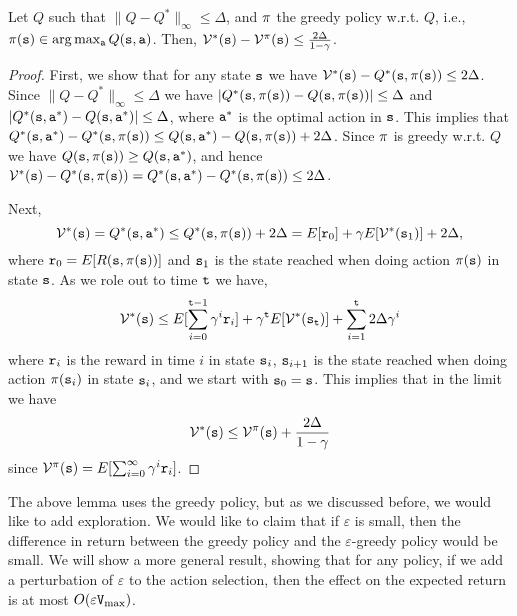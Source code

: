 \begin{lemma}
\label{lemma:Q-greedy-policy}
%
Let $Q$ such that $\| Q-Q^*\|_\infty \leq \Delta$, and $\pi$ the
greedy policy w.r.t. $Q$, i.e., $\pi({\tt s})\in \arg\max_{\tt a}
Q({\tt s},{\tt a})$. Then,
$\mathcal{V}^*({\tt s})-\mathcal{V}^\pi({\tt s})\leq
\frac{2\Delta}{1-\gamma}$.
\end{lemma}
\begin{proof}
First, we show that for any state ${\tt s}$ we have
$\mathcal{V}^*({\tt s})-Q^*({\tt s},\pi({\tt s}))\leq 2\Delta$. Since
$\| Q-Q^*\|_\infty \leq \Delta$ we have
$|Q^*({\tt s},\pi({\tt s}))-Q({\tt s},\pi({\tt s}))|\leq \Delta$
and $|Q^*({\tt s},{\tt a}^*)-Q({\tt s},{\tt a}^*)|\leq \Delta$, where
${\tt a}^*$ is the optimal action in ${\tt s}$. This implies that
%
$Q^*({\tt s},{\tt a}^*)-Q^*({\tt s},\pi({\tt s}))\leq
Q({\tt s},{\tt a}^*)-Q({\tt s},\pi({\tt s}))+2\Delta$.
%
Since $\pi$ is greedy w.r.t. $Q$ we have
$Q({\tt s},\pi({\tt s}))\geq Q({\tt s},{\tt a}^*)$, and hence
$\mathcal{V}^*({\tt s})-Q^*({\tt s},\pi({\tt s}))=Q^*({\tt s},{\tt a}^*)-Q^*({\tt s},\pi({\tt s}))\leq
2\Delta$.


Next,
$$\mathcal{V}^*({\tt s})=Q^*({\tt s},{\tt a}^*)\leq Q^*({\tt s},\pi({\tt s}))+2\Delta = E[{\tt r}_0]+\gamma
E[\mathcal{V}^*({\tt s}_1)]+2\Delta,$$ where
${\tt r}_0=E[R({\tt s},\pi({\tt s}))]$ and ${\tt s}_1$ is the state
reached when doing action $\pi({\tt s})$ in state ${\tt s}$. As we
role out to time ${\tt t}$ we have,
\[
\mathcal{V}^*({\tt s})\leq E[\sum_{i=0}^{{\tt t}-1} \gamma^i
{\tt r}_i]+\gamma^{\tt t}
E[\mathcal{V}^*({\tt s}_{\tt t})]+\sum_{i=1}^{\tt t} 2\Delta\gamma^i
\]
where ${\tt r}_i$ is the reward in time $i$ in state ${\tt s}_i$,
${\tt s}_{i+1}$ is the state reached when doing action
$\pi({\tt s}_i)$ in state ${\tt s}_i$, and we start with
${\tt s}_0={\tt s}$.
%
This implies that in the limit we have
\[
\mathcal{V}^*({\tt s})\leq \mathcal{V}^\pi({\tt s})+\frac{
2\Delta}{1-\gamma}
\]
since $\mathcal{V}^\pi({\tt s})=E[\sum_{i=0}^{\infty} \gamma^i
{\tt r}_i]$.
\end{proof}

The above lemma uses the greedy policy, but as we discussed before,
we would like to add exploration. We would like to claim that if
$\varepsilon$ is small, then the difference in return between the
greedy policy and the $\varepsilon$-greedy policy would be small. We
will show a more general result, showing that for any policy, if we
add a perturbation of $\varepsilon$ to the action selection, then
the effect on the expected return is at most $O(\varepsilon{\tt V}_{\max } )$.

